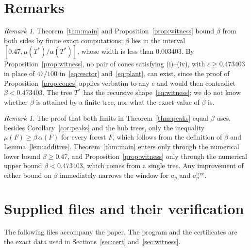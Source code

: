 \documentclass{amsart}
\numberwithin{equation}{section}
\theoremstyle{plain}
\theoremstyle{definition}
\theoremstyle{remark}
\newtheorem{remark}[theorem]{Remark}
\begin{document}
\section{Remarks}\label{sec:remarks}

\begin{remark}
Theorem~\ref{thm:main} and Proposition~\ref{prop:witness} bound $\beta$ from both sides by finite exact computations: $\beta$ lies in the interval $[0.47,\mu(T^*)/\alpha(T^*)]$, whose width is less than $0.003403$. By Proposition~\ref{prop:witness}, no pair of cones satisfying (i)--(iv), with $c\ge0.473403$ in place of $47/100$ in~\eqref{eq:vector} and~\eqref{eq:plant}, can exist, since the proof of Proposition~\ref{prop:cones} applies verbatim to any $c$ and would then contradict $\beta<0.473403$. The tree $T^*$ has the recursive shape~\eqref{eq:witness}; we do not know whether $\beta$ is attained by a finite tree, nor what the exact value of $\beta$ is.
\end{remark}

\begin{remark}
The proof that both limits in Theorem~\ref{thm:peaks} equal $\beta$ uses, besides Corollary~\ref{cor:peaks} and the hub trees, only the inequality $\mu(F)\ge\beta\,\alpha(F)$ for every forest $F$, which follows from the definition of $\beta$ and Lemma~\ref{lem:additive}. Theorem~\ref{thm:main} enters only through the numerical lower bound $\beta\ge0.47$, and Proposition~\ref{prop:witness} only through the numerical upper bound $\beta<0.473403$, which comes from a single tree. Any improvement of either bound on $\beta$ immediately narrows the window for $a_p$ and $a_p^{\mathrm{tree}}$.
\end{remark}

\appendix

\section{Supplied files and their verification}\label{app:data}

The following files accompany the paper. The program and the certificates are the exact data used in Sections~\ref{sec:cert} and~\ref{sec:witness}.
\end{document}
